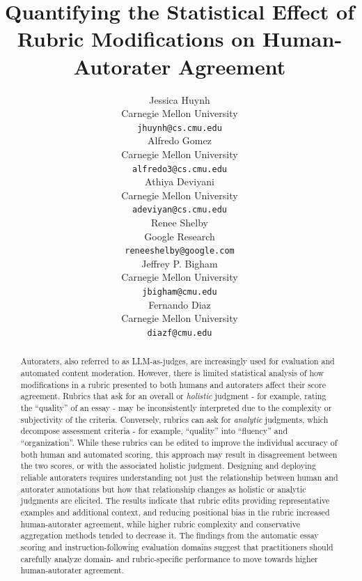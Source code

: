 \documentclass[11pt]{article}
\title{Quantifying the Statistical Effect of Rubric Modifications on Human-Autorater Agreement}
\author{Jessica Huynh \\
  Carnegie Mellon University \\
  \texttt{jhuynh@cs.cmu.edu} \\\And
  Alfredo Gomez \\
  Carnegie Mellon University \\
  \texttt{alfredo3@cs.cmu.edu} \\\And
  Athiya Deviyani \\
  Carnegie Mellon University \\
  \texttt{adeviyan@cs.cmu.edu} \\\AND
  Renee Shelby \\
  Google Research \\
  \texttt{reneeshelby@google.com} \\\And
  Jeffrey P. Bigham \\
  Carnegie Mellon University \\
  \texttt{jbigham@cmu.edu} \\\And
  Fernando Diaz \\
  Carnegie Mellon University \\
  \texttt{diazf@cmu.edu} \\}
\begin{document}
\maketitle
\begin{abstract}
Autoraters, also referred to as LLM-as-judges, are increasingly used for evaluation and automated content moderation. However, there is limited statistical analysis of how modifications in a rubric presented to both humans and autoraters affect their score agreement. Rubrics that ask for an overall or \emph{holistic} judgment - for example, rating the ``quality'' of an essay - may be inconsistently interpreted due to the complexity or subjectivity of the criteria. Conversely, rubrics can ask for \emph{analytic} judgments, which decompose assessment criteria - for example, ``quality'' into ``fluency'' and ``organization''. While these rubrics can be edited to improve the individual accuracy of both human and automated scoring, this approach may result in disagreement between the two scores, or with the associated holistic judgment. Designing and deploying reliable autoraters requires understanding not just the relationship between human and autorater annotations but how that relationship changes as holistic or analytic judgments are elicited. The results indicate that rubric edits providing representative examples and additional context, and reducing positional bias in the rubric increased human-autorater agreement, while higher rubric complexity and conservative aggregation methods tended to decrease it. The findings from the automatic essay scoring and instruction-following evaluation domains suggest that practitioners should carefully analyze domain- and rubric-specific performance to move towards higher human-autorater agreement. 
\end{abstract}









%


\appendix


\end{document}
